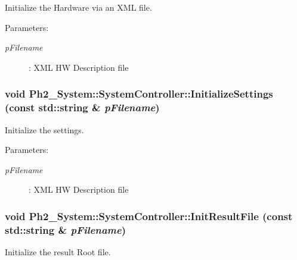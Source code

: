 Initialize the Hardware via an XML file. 

\begin{Desc}
\item[Parameters:]
\begin{description}
\item[{\em p\-Filename}]: XML HW Description file \end{description}
\end{Desc}
\hypertarget{class_ph2___system_1_1_system_controller_2b52c096bdcb9807a2c4ece6e2eede5f}{
\subsubsection[InitializeSettings]{\setlength{\rightskip}{0pt plus 5cm}void Ph2\_\-System::System\-Controller::Initialize\-Settings (const std::string \& {\em p\-Filename})}}
\label{class_ph2___system_1_1_system_controller_2b52c096bdcb9807a2c4ece6e2eede5f}


Initialize the settings. 

\begin{Desc}
\item[Parameters:]
\begin{description}
\item[{\em p\-Filename}]: XML HW Description file \end{description}
\end{Desc}
\hypertarget{class_ph2___system_1_1_system_controller_60c6f410bf7f2cda51256670933e11d0}{
\subsubsection[InitResultFile]{\setlength{\rightskip}{0pt plus 5cm}void Ph2\_\-System::System\-Controller::Init\-Result\-File (const std::string \& {\em p\-Filename})}}
\label{class_ph2___system_1_1_system_controller_60c6f410bf7f2cda51256670933e11d0}


Initialize the result Root file. 

